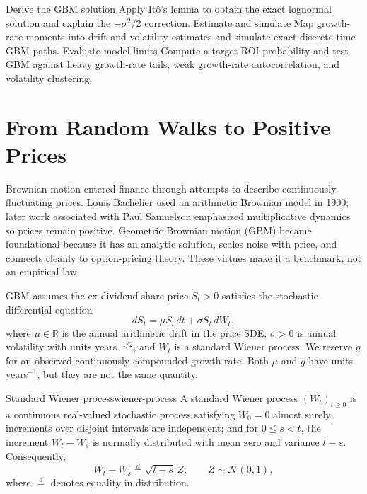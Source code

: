 \documentclass[11pt]{article}
\begin{document}

\learningobjectives
  {Derive the GBM solution}
  {Apply It\^o's lemma to obtain the exact lognormal solution and explain the $-\sigma^2/2$ correction.}
  {Estimate and simulate}
  {Map growth-rate moments into drift and volatility estimates and simulate exact discrete-time GBM paths.}
  {Evaluate model limits}
  {Compute a target-ROI probability and test GBM against heavy growth-rate tails, weak growth-rate autocorrelation, and volatility clustering.}

\section{From Random Walks to Positive Prices}

Brownian motion entered finance through attempts to describe continuously fluctuating prices. Louis Bachelier used an arithmetic Brownian model in 1900; later work associated with Paul Samuelson emphasized multiplicative dynamics so prices remain positive. Geometric Brownian motion (GBM) became foundational because it has an analytic solution, scales noise with price, and connects cleanly to option-pricing theory. These virtues make it a benchmark, not an empirical law.

GBM assumes the ex-dividend share price $S_t>0$ satisfies the stochastic differential equation
\begin{equation}
  \label{eq:gbm-sde}
  dS_t=\mu S_t\,dt+\sigma S_t\,dW_t,
\end{equation}
where $\mu\in\mathbb{R}$ is the annual arithmetic drift in the price SDE, $\sigma>0$ is annual volatility with units years$^{-1/2}$, and $W_t$ is a standard Wiener process. We reserve $g$ for an observed continuously compounded growth rate. Both $\mu$ and $g$ have units years$^{-1}$, but they are not the same quantity.

\begin{definition}{Standard Wiener process}{wiener-process}
A standard Wiener process $(W_t)_{t\geq0}$ is a continuous real-valued stochastic process satisfying $W_0=0$ almost surely; increments over disjoint intervals are independent; and for $0\leq s<t$, the increment $W_t-W_s$ is normally distributed with mean zero and variance $t-s$. Consequently,
\begin{equation}
  \label{eq:wiener-increment}
  W_t-W_s\overset{d}{=}\sqrt{t-s}\,Z,
  \qquad Z\sim\mathcal{N}(0,1),
\end{equation}
where $\overset{d}{=}$ denotes equality in distribution.
\end{definition}
\end{document}
